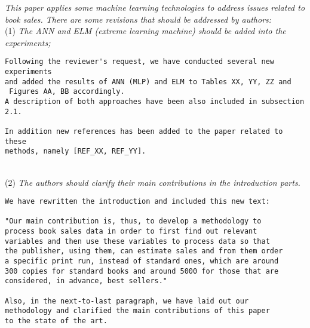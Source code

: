 \documentclass[preprint]{elsarticle}
\begin{document}
\noindent \emph{This paper applies some machine learning technologies to address issues related to book sales. There are some revisions that should be addressed by authors: } \\


\noindent (1) \emph{The ANN and ELM (extreme learning machine) should be added into the experiments; } 

\begin{verbatim}
Following the reviewer's request, we have conducted several new experiments 
and added the results of ANN (MLP) and ELM to Tables XX, YY, ZZ and
 Figures AA, BB accordingly. 
A description of both approaches have been also included in subsection 2.1.

In addition new references has been added to the paper related to these 
methods, namely [REF_XX, REF_YY].
\end{verbatim}


~\\
\noindent (2) \emph{The authors should clarify their main contributions in the introduction parts.}

\begin{verbatim}
We have rewritten the introduction and included this new text:

"Our main contribution is, thus, to develop a methodology to 
process book sales data in order to first find out relevant 
variables and then use these variables to process data so that 
the publisher, using them, can estimate sales and from them order 
a specific print run, instead of standard ones, which are around 
300 copies for standard books and around 5000 for those that are 
considered, in advance, best sellers."

Also, in the next-to-last paragraph, we have laid out our 
methodology and clarified the main contributions of this paper 
to the state of the art.
\end{verbatim}
\end{document}
